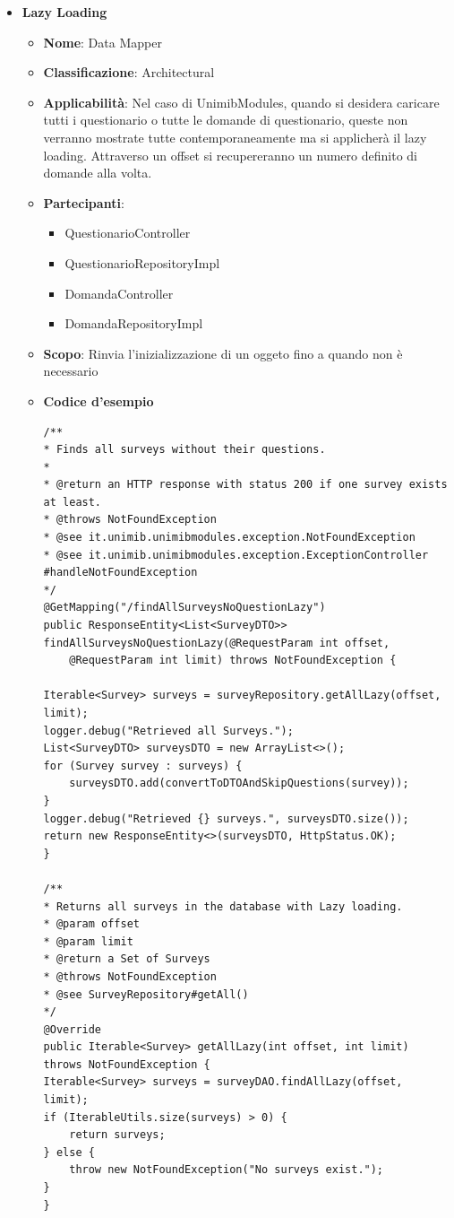 \documentclass[12pt]{article}
\begin{document}
\begin{itemize}
		
		\item \textbf{Lazy Loading}
		\begin{itemize}
            \item \textbf{Nome}: Data Mapper
            \item \textbf{Classificazione}: Architectural
            \item \textbf{Applicabilità}: Nel caso di UnimibModules, quando si desidera caricare tutti i questionario o tutte le domande di questionario, queste non verranno mostrate tutte contemporaneamente ma si applicherà il lazy loading. Attraverso un offset si recupereranno un numero definito di domande alla volta.
            \item \textbf{Partecipanti}:
                \begin{itemize}
                    \item QuestionarioController
                    \item QuestionarioRepositoryImpl
                    \item DomandaController
                    \item DomandaRepositoryImpl
                \end{itemize}
            \item \textbf{Scopo}: Rinvia l'inizializzazione di un oggeto fino a quando non è necessario
            \item \textbf{Codice d'esempio}
            \begin{lstlisting}
/**
* Finds all surveys without their questions.
* 
* @return an HTTP response with status 200 if one survey exists at least.
* @throws NotFoundException
* @see it.unimib.unimibmodules.exception.NotFoundException
* @see it.unimib.unimibmodules.exception.ExceptionController
#handleNotFoundException
*/
@GetMapping("/findAllSurveysNoQuestionLazy")
public ResponseEntity<List<SurveyDTO>> findAllSurveysNoQuestionLazy(@RequestParam int offset, 
	@RequestParam int limit) throws NotFoundException {

Iterable<Survey> surveys = surveyRepository.getAllLazy(offset, limit);
logger.debug("Retrieved all Surveys.");
List<SurveyDTO> surveysDTO = new ArrayList<>();
for (Survey survey : surveys) {
	surveysDTO.add(convertToDTOAndSkipQuestions(survey));
}
logger.debug("Retrieved {} surveys.", surveysDTO.size());
return new ResponseEntity<>(surveysDTO, HttpStatus.OK);
}

/**
* Returns all surveys in the database with Lazy loading.
* @param offset
* @param limit
* @return a Set of Surveys
* @throws NotFoundException
* @see SurveyRepository#getAll()
*/
@Override
public Iterable<Survey> getAllLazy(int offset, int limit) throws NotFoundException {
Iterable<Survey> surveys = surveyDAO.findAllLazy(offset, limit);
if (IterableUtils.size(surveys) > 0) {
	return surveys;
} else {
	throw new NotFoundException("No surveys exist.");
}
}
            \end{lstlisting}
        \end{itemize}
	\end{itemize}
\end{document}

